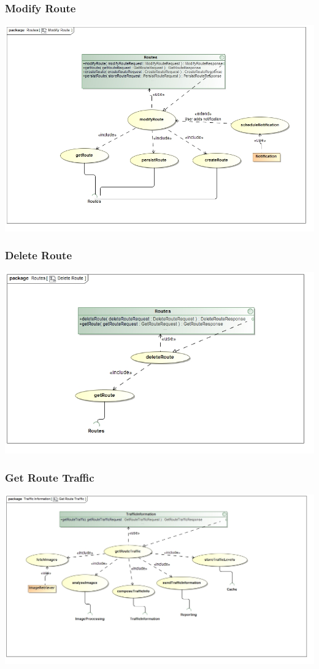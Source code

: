 \documentclass[a4paper,12pt]{article}
\begin{document}
\subsubsection{Modify Route} 
\includegraphics[width=\textwidth]{images/Modify_Route.jpg}
\subsubsection{Delete Route}
\includegraphics[width=\textwidth]{images/Delete_Route.jpg}
\subsubsection{Get Route Traffic}
\includegraphics[width=\textwidth]{images/Get_Route_Traffic.jpg}
\end{document}
